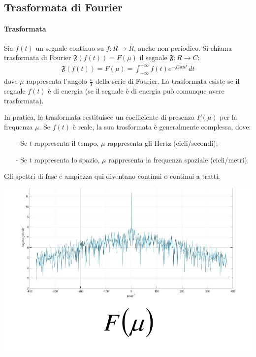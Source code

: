 \documentclass[a4paper, 10pt]{report}
\begin{document}
\subsection*{Trasformata di Fourier}
\paragraph*{Trasformata} Sia $f(t)$ un segnale continuo su $f: R \rightarrow R$, anche non periodico. Si chiama trasformata di Fourier $\mathfrak{F}(f(t)) = F(\mu)$ il segnale $\mathfrak{F} : R \rightarrow C$:
\begin{align*}
\mathfrak{F}(f(t)) = F(\mu) = \int_{-\infty}^{+\infty} f(t)e^{-j2\pi \mu t} \, dt
\end{align*}
\noindent dove $\mu$ rappresenta l'angolo $\frac{n}{T}$ della serie di Fourier. La trasformata esiste se il segnale $f(t)$ è di energia (se il segnale è di energia può comunque avere trasformata).

\noindent In pratica, la trasformata restituisce un coefficiente di presenza $F(\mu)$ per la frequenza $\mu$. Se $f(t)$ è reale, la sua trasformata è generalmente complessa, dove:
\begin{itemize}
\item[-] Se $t$ rappresenta il tempo, $\mu$ rappresenta gli Hertz (cicli/secondi);
\item[-] Se $t$ rappresenta lo spazio, $\mu$ rappresenta la frequenza spaziale (cicli/metri).
\end{itemize}
\noindent Gli spettri di fase e ampiezza qui diventano continui o continui a tratti.

\begin{center}
\includegraphics[scale=0.4]{2.pdf}
\end{center}
\end{document}
